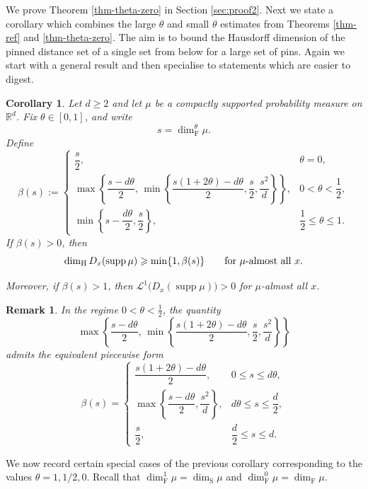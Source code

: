 \documentclass[11pt]{amsart}
\numberwithin{equation}{section}
\renewcommand{\ge}{\geqslant}
\renewcommand{\le}{\leqslant}
\newcommand{\hd}{\dim_{\textup{H}}}
\newcommand{\fd}{\dim_{\mathrm{F}}}
\newcommand{\sd}{\dim_{\mathrm{S}}}
\newtheorem{remark}[theorem]{Remark}
\newtheorem{corollary}[theorem]{Corollary}
\newcommand{\spt}{\operatorname{supp}}
\theoremstyle{plain}
\theoremstyle{remark}
\newcommand{\Rd}{\mathbb{R}^d}
\newcommand{\cL}{\mathcal{L}}
\begin{document}
We prove Theorem \ref{thm-theta-zero} in Section \ref{sec:proof2}. Next we state a corollary which combines the large $\theta$ and small $\theta$ estimates from Theorems \ref{thm-ref} and \ref{thm-theta-zero}.  The aim is to bound the Hausdorff dimension of the pinned distance set of a single set from below for a large set of pins.  Again we start with a general result and then specialise to  statements which are easier to digest.

\begin{corollary}\label{cormain}
Let \(d\ge 2\) and let \(\mu\) be a compactly supported probability measure on \(\Rd\).  Fix \(\theta\in[0,1]\), and write
\[
s=\dim_{\mathrm{F}}^\theta \mu.
\]
Define
\[
\beta(s):=
\begin{cases}
\dfrac{s}{2}, & \theta=0,\\[2ex]
\max\!\left\{\dfrac{s-d\theta}{2},\,
\min\left\{\dfrac{s(1+2\theta)-d\theta}{2},\dfrac{s}{2},\dfrac{s^2}{d}\right\}\right\},
& 0<\theta<\dfrac12,\\[3ex]
\min\left\{s-\dfrac{d\theta}{2},\dfrac{s}{2}\right\},
& \dfrac12\le \theta\le 1.
\end{cases}
\]
If \(\beta(s)>0\), then \[
\hd D_x(\spt\mu)\ge \min\{1,\beta(s)\}
\qquad\text{for \(\mu\)-almost all }x.
\]

Moreover, if \(\beta(s)>1\), then \(\cL^1\bigl(D_x(\spt\mu)\bigr)>0\) for \(\mu\)-almost all \(x\).
\end{corollary}

\begin{remark}
In the regime \(0<\theta<\frac12\), the quantity
\[
\max\!\left\{\frac{s-d\theta}{2},\,
\min\left\{\frac{s(1+2\theta)-d\theta}{2},\frac{s}{2},\frac{s^2}{d}\right\}\right\}
\]
admits the equivalent piecewise form
\[\beta(s)=
\begin{cases}
\dfrac{s(1+2\theta)-d\theta}{2}, & 0\le s\le d\theta,\\[2ex]
\max\!\left\{\dfrac{s-d\theta}{2},\dfrac{s^2}{d}\right\},
& d\theta\le s\le \dfrac d2,\\[3ex]
\dfrac{s}{2}, & \dfrac d2\le s\le d.
\end{cases}
\]
\end{remark}







We now record certain special cases of the previous corollary corresponding to the values \(\theta=1,1/2,0\). Recall that \(\dim_{\mathrm{F}}^1\mu=\sd\mu\) and \(\dim_{\mathrm{F}}^0\mu=\fd\mu\).
\end{document}
